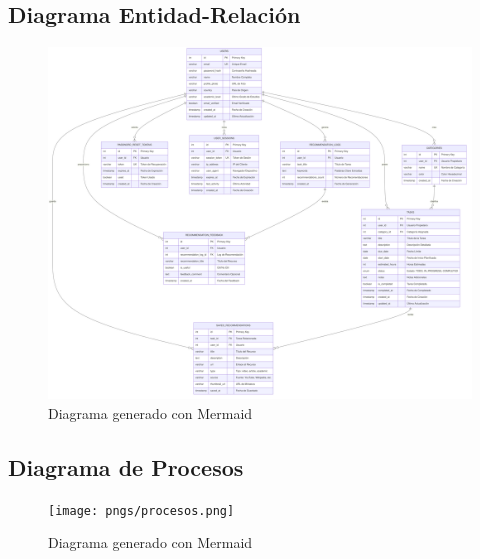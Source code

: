 \documentclass{pretexto/report}
\begin{document}
\subsection{Diagrama Entidad-Relación}
\begin{figure}[H]
    \centering
    \includegraphics[width=\linewidth]{pngs/relacional.png}
    \caption{Diagrama generado con Mermaid}
\end{figure}

\subsection{Diagrama de Procesos}
\begin{figure}[H]
    \centering
    \texttt{[image: pngs/procesos.png]}
    \caption{Diagrama generado con Mermaid}
\end{figure}
\end{document}
